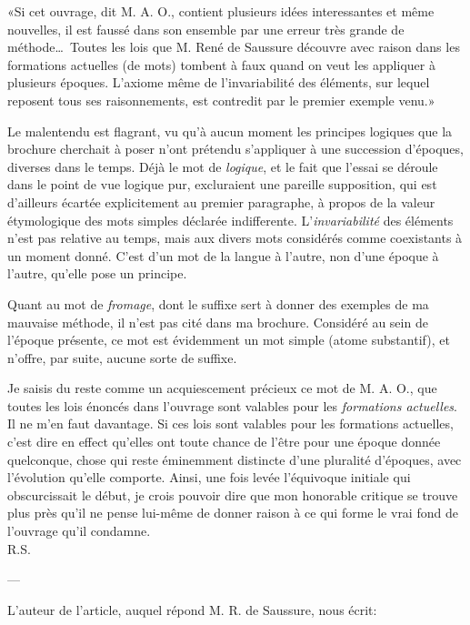 \begin{appendices}
{    «Si cet ouvrage, dit M. A. O., contient plusieurs idées
    interessantes et même nouvelles, il est faussé dans son
    ensemble par une erreur très grande de méthode\ldots\  Toutes
    les lois que M. René de Saussure découvre avec raison dans les
    formations actuelles (de mots) tombent à faux quand on veut les
    appliquer à plusieurs époques. L'axiome même de
    l'invariabilité des éléments, sur lequel reposent tous ses
    raisonnements, est contredit par le premier exemple venu.»

    Le malentendu est flagrant, vu qu'à aucun moment les principes
    logiques que la brochure cherchait à poser n'ont prétendu
    s'appliquer à une succession d'époques, diverses dans le
    temps.  Déjà le mot de \emph{logique}, et le fait que l'essai
    se déroule dans le point de vue logique pur, excluraient une
    pareille supposition, qui est d'ailleurs écartée explicitement
    au premier paragraphe, à propos de la valeur étymologique des
    mots simples déclarée indifferente. L'\emph{invariabilité}
    des éléments n'est pas relative au temps, mais aux divers mots
    considérés comme coexistants à un moment donné. C'est d'un
    mot de la langue à l'autre, non d'une époque à l'autre,
    qu'elle pose un principe.

    Quant au mot de \emph{fromage}, dont le suffixe sert à donner
    des exemples de ma mauvaise méthode, il n'est pas cité dans ma
    brochure. Considéré au sein de l'époque présente, ce mot
    est évidemment un mot simple (atome substantif), et n'offre, par
    suite, aucune sorte de suffixe.

    Je saisis du reste comme un acquiescement précieux ce mot de
    M. A. O., que toutes les lois énoncés dans l'ouvrage sont
    valables pour les \emph{formations actuelles}. Il ne m'en faut
    davantage. Si ces lois sont valables pour les formations
    actuelles, c'est dire en effect qu'elles ont toute chance de
    l'être pour une époque donnée quelconque, chose qui reste
    éminemment distincte d'une pluralité d'époques, avec
    l'évolution qu'elle comporte. Ainsi, une fois levée
    l'équivoque initiale qui obscurcissait le début, je crois
    pouvoir dire que mon honorable critique se trouve plus près
    qu'il ne pense lui-même de donner raison à ce qui forme le
    vrai fond de l'ouvrage qu'il condamne.\\
      \hbox{}\hfill\hbox{R.S.}
    \begin{center}
      ---
    \end{center}
    L'auteur de l'article, auquel répond M. R. de Saussure, nous
    écrit:

}
\end{appendices}
